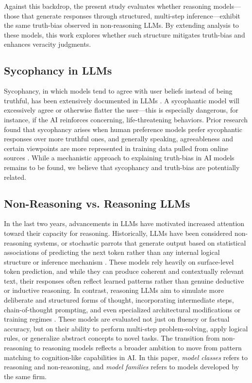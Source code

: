 \documentclass{article}
\begin{document}
Against this backdrop, the present study evaluates whether reasoning models---those that generate responses through structured, multi-step inference---exhibit the same truth-bias observed in non-reasoning LLMs. By extending analysis to these models, this work explores whether such structure mitigates truth-bias and enhances veracity judgments.

\subsection{Sycophancy in LLMs}

Sycophancy, in which models tend to agree with user beliefs instead of being truthful, has been extensively documented in LLMs \citep{chen2025yesmentruthtellersaddressingsycophancy}. A sycophantic model will excessively agree or otherwise flatter the user---this is especially dangerous, for instance, if the AI reinforces concerning, life-threatening behaviors. Prior research \citep{sharma2023understandingsycophancylanguagemodels} found that sycophancy arises when human preference models prefer sycophantic responses over more truthful ones, and generally speaking, agreeableness and certain viewpoints are more represented in training data pulled from online sources \citep{malmqvist2024sycophancylargelanguagemodels}. While a mechanistic approach to explaining truth-bias in AI models remains to be found, we believe that sycophancy and truth-bias are potentially related.

\subsection{Non-Reasoning vs. Reasoning LLMs}

In the last two years, advancements in LLMs have motivated increased attention toward their capacity for reasoning. Historically, LLMs have been considered non-reasoning systems, or stochastic parrots that generate output based on statistical associations of predicting the next token rather than any internal logical structure or inference mechanism \citep{10.1145/3442188.3445922}. These models rely heavily on surface-level token prediction, and while they can produce coherent and contextually relevant text, their responses often reflect learned patterns rather than genuine deductive or inductive reasoning. In contrast, reasoning LLMs aim to simulate more deliberate and structured forms of thought, incorporating intermediate steps, chain-of-thought prompting, and even specialized architectural modifications or training regimes \citep{wei2023chainofthoughtpromptingelicitsreasoning}. These models are evaluated not just on fluency or factual accuracy, but on their ability to perform multi-step problem-solving, apply logical rules, or generalize abstract concepts to novel tasks. The transition from non-reasoning to reasoning models reflects a broader ambition to move from pattern matching to cognition-like capabilities in AI. In this paper, \textit{model classes} refers to reasoning and non-reasoning, and \textit{model families} refers to models developed by the same firm.
\end{document}
